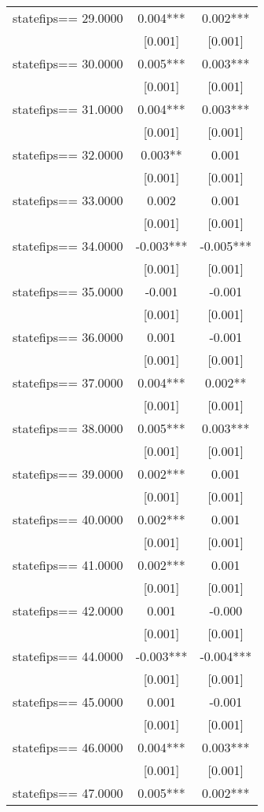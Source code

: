 \documentclass[]{article}
\begin{document}
\begin{tabular}{lcc}
statefips==    29.0000 & 0.004*** & 0.002*** \\
 & [0.001] & [0.001] \\
statefips==    30.0000 & 0.005*** & 0.003*** \\
 & [0.001] & [0.001] \\
statefips==    31.0000 & 0.004*** & 0.003*** \\
 & [0.001] & [0.001] \\
statefips==    32.0000 & 0.003** & 0.001 \\
 & [0.001] & [0.001] \\
statefips==    33.0000 & 0.002 & 0.001 \\
 & [0.001] & [0.001] \\
statefips==    34.0000 & -0.003*** & -0.005*** \\
 & [0.001] & [0.001] \\
statefips==    35.0000 & -0.001 & -0.001 \\
 & [0.001] & [0.001] \\
statefips==    36.0000 & 0.001 & -0.001 \\
 & [0.001] & [0.001] \\
statefips==    37.0000 & 0.004*** & 0.002** \\
 & [0.001] & [0.001] \\
statefips==    38.0000 & 0.005*** & 0.003*** \\
 & [0.001] & [0.001] \\
statefips==    39.0000 & 0.002*** & 0.001 \\
 & [0.001] & [0.001] \\
statefips==    40.0000 & 0.002*** & 0.001 \\
 & [0.001] & [0.001] \\
statefips==    41.0000 & 0.002*** & 0.001 \\
 & [0.001] & [0.001] \\
statefips==    42.0000 & 0.001 & -0.000 \\
 & [0.001] & [0.001] \\
statefips==    44.0000 & -0.003*** & -0.004*** \\
 & [0.001] & [0.001] \\
statefips==    45.0000 & 0.001 & -0.001 \\
 & [0.001] & [0.001] \\
statefips==    46.0000 & 0.004*** & 0.003*** \\
 & [0.001] & [0.001] \\
statefips==    47.0000 & 0.005*** & 0.002*** \\

\end{tabular}
\end{document}
